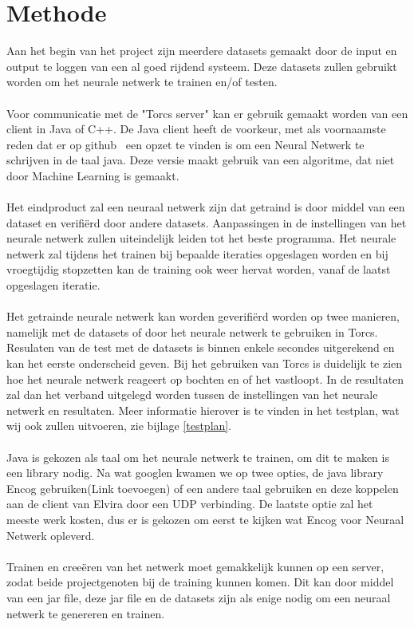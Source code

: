 \documentclass{article}
\begin{document}
\pagebreak
\pagebreak

\pagebreak
\section{Methode}
Aan het begin van het project zijn meerdere datasets gemaakt door de input en output te loggen van een al goed rijdend systeem. Deze datasets zullen gebruikt worden om het neurale netwerk te trainen en/of testen.\\\\ 
Voor communicatie met de "Torcs server" kan er gebruik gemaakt worden van een client in Java of C++. De Java client heeft de voorkeur, met als voornaamste reden dat er op github~\cite{java-client} een opzet te vinden is om een Neural Netwerk te schrijven in de taal java. Deze versie maakt gebruik van een algoritme, dat niet door Machine Learning is gemaakt. \\\\
Het eindproduct zal een neuraal netwerk zijn dat getraind is door middel van een dataset en verifi\"erd door andere datasets. Aanpassingen in de instellingen van het neurale netwerk zullen uiteindelijk leiden tot het beste programma. Het neurale netwerk zal tijdens het trainen bij bepaalde iteraties opgeslagen worden en bij vroegtijdig stopzetten kan de training ook weer hervat worden, vanaf de laatst opgeslagen iteratie. \\\\
Het getrainde neurale netwerk kan worden geverifi\"erd worden op twee manieren, namelijk met de datasets of door het neurale netwerk te gebruiken in Torcs. Resulaten van de test met de datasets is binnen enkele secondes uitgerekend en kan het eerste onderscheid geven. Bij het gebruiken van Torcs is duidelijk te zien hoe het neurale netwerk reageert op bochten en of het vastloopt. In de resultaten zal dan het verband uitgelegd worden tussen de instellingen van het neurale netwerk en resultaten.  Meer informatie hierover is te vinden in het testplan, wat wij ook zullen uitvoeren, zie bijlage \ref{testplan}. \\\\
Java is gekozen als taal om het neurale netwerk te trainen, om dit te maken is een library nodig. Na wat googlen kwamen we op twee opties, de java library Encog gebruiken(Link toevoegen) of een andere taal gebruiken en deze koppelen aan de client van Elvira door een UDP verbinding. De laatste optie zal het meeste werk kosten, dus er is gekozen om eerst te kijken wat Encog voor Neuraal Netwerk opleverd. 
\\\\
Trainen en cree\"eren van het netwerk moet gemakkelijk kunnen op een server, zodat beide projectgenoten bij de training kunnen komen. Dit kan door middel van een jar file, deze jar file en de datasets zijn als enige nodig om een neuraal netwerk te genereren en trainen.
\pagebreak
\end{document}
